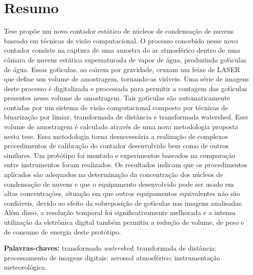 \chapter*{Resumo}
\label{CHP:RESUM0}%
\thispagestyle{empty}




 Tese prop\~{o}e um novo contador est\'{a}tico de n\'{u}cleos de condensa\c{c}\~{a}o de nuvens baseado em t\'{e}cnicas de vis\~{a}o computacional. O processo concebido nesse novo contador consiste na captura de uma amostra do ar atmosf\'{e}rico dentro de uma c\^{a}mara de nuvens est\'{a}tica supersaturada de vapor de \'{a}gua, produzindo got\'{\i}culas de \'{a}gua. Essas got\'{\i}culas, ao ca\'{\i}rem por gravidade, cruzam um feixe de LASER que define um volume de amostragem, tornando-as vis\'{\i}veis. Uma s\'{e}rie de imagens deste processo \'{e} digitalizada e processada para permitir a contagem das got\'{\i}culas presentes nesse volume de amostragem. Tais got\'{\i}culas s\~{a}o automaticamente contadas por um sistema de vis\~{a}o computacional composto por t\'{e}cnicas de binariza\c{c}\~{a}o por limiar, transformada de dist\^{a}ncia e transformada watershed. Esse volume de amostragem \'{e} calculado atrav\'{e}s de uma nova metodologia proposta nesta tese. Essa metodologia torna desnecess\'{a}ria a realiza\c{c}\~{a}o de complexos procedimentos de calibra\c{c}\~{a}o do contador desenvolvido bem como de outros similares. Um prot\'{o}tipo foi montado e experimentos baseados na compara\c{c}\~{a}o entre instrumentos foram realizados. Os resultados indicam que os procedimentos aplicados s\~{a}o adequados na determina\c{c}\~{a}o da concentra\c{c}\~{a}o dos n\'{u}cleos de condensa\c{c}\~{a}o de nuvens e que o equipamento desenvolvido pode ser usado em altas concentra\c{c}\~{o}es, situa\c{c}\~{a}o em que outros equipamentos equivalentes n\~{a}o s\~{a}o confi\'{a}veis, devido ao efeito da sobreposi\c{c}\~{a}o de got\'{\i}culas nas imagens analisadas. Al\'{e}m disso, a resolu\c{c}\~{a}o temporal foi significativamente melhorada e a intensa utiliza\c{c}\~{a}o da eletr\^{o}nica digital tamb\'{e}m permitiu a redu\c{c}\~{a}o de volume, de peso e de consumo de energia deste prot\'{o}tipo.



\noindent \textbf{Palavras-chaves:}  transformada \emph{watershed}; transformada de dist\^{a}ncia; processamento de imagens digitais; aerossol atmosf\'{e}rico; instrumenta\c{c}\~{a}o meteorol\'{o}gica.
